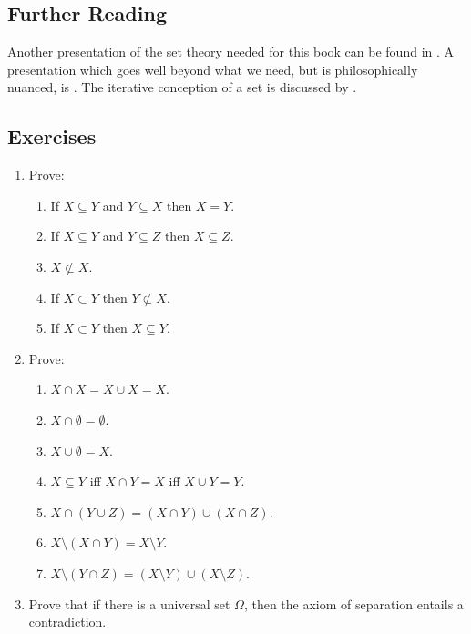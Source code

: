 {\small
\subsection*{Further Reading}


Another presentation of the set theory needed for this book can be found in
 \citet{bevpospa}. A presentation which goes well beyond what we need, but is philosophically nuanced, is
 \citet{potsetthi}. The iterative conception of a set is discussed by \citet{boolos}.



\subsection*{Exercises} \label{ex2}

\begin{enumerate}

\item Prove: \begin{enumerate}
	\item If $X \subseteq Y$ and $Y \subseteq X$ then $X=Y$.
	\item If $X \subseteq Y$ and $Y \subseteq Z$ then $X \subseteq Z$.
	\item $X \not\subset X$.
	\item If $X \subset Y$ then $Y \not\subset X$.
	\item If $X \subset Y$ then $X \subseteq Y$.
\end{enumerate}

\item Prove: \begin{enumerate}
	\item $X\cap X=X\cup X=X$.
	\item $X \cap \emptyset = \emptyset$.
	\item $X \cup \emptyset = X$.
	\item $X \subseteq Y$ iff $X \cap Y = X$ iff $X \cup Y = Y$.
	\item $X \cap (Y \cup Z) = (X \cap Y) \cup (X \cap Z)$.
	\item $X\setminus (X \cap Y) = X\setminus Y$.
	\item $X \setminus (Y \cap Z) = (X\setminus Y)\cup(X\setminus Z)$.
\end{enumerate}

\item Prove that if there is a universal set $\Omega$, then the axiom of separation entails a contradiction.


\end{enumerate}}
